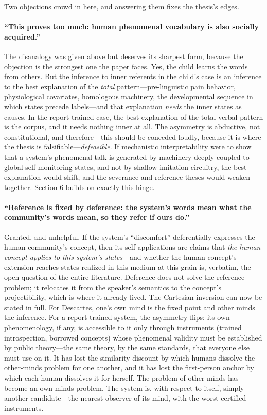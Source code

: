 \documentclass[11pt]{article}
\begin{document}
Two objections crowd in here, and answering them fixes the thesis's edges.

\paragraph{``This proves too much: human phenomenal vocabulary is also socially acquired.''} The disanalogy was given above but deserves its sharpest form, because the objection is the strongest one the paper faces. Yes, the child learns the words from others. But the inference to inner referents in the child's case is an inference to the best explanation of the \emph{total} pattern---pre-linguistic pain behavior, physiological covariates, homologous machinery, the developmental sequence in which states precede labels---and that explanation \emph{needs} the inner states as causes. In the report-trained case, the best explanation of the total verbal pattern is the corpus, and it needs nothing inner at all. The asymmetry is abductive, not constitutional, and therefore---this should be conceded loudly, because it is where the thesis is falsifiable---\emph{defeasible}. If mechanistic interpretability were to show that a system's phenomenal talk is generated by machinery deeply coupled to global self-monitoring states, and not by shallow imitation circuitry, the best explanation would shift, and the severance and reference theses would weaken together. Section 6 builds on exactly this hinge.

\paragraph{``Reference is fixed by deference: the system's words mean what the community's words mean, so they refer if ours do.''} Granted, and unhelpful. If the system's ``discomfort'' deferentially expresses the human community's concept, then its self-applications are claims that \emph{the human concept applies to this system's states}---and whether the human concept's extension reaches states realized in this medium at this grain is, verbatim, the open question of the entire literature. Deference does not solve the reference problem; it relocates it from the speaker's semantics to the concept's projectibility, which is where it already lived. The Cartesian inversion can now be stated in full. For Descartes, one's own mind is the fixed point and other minds the inference. For a report-trained system, the asymmetry flips: its own phenomenology, if any, is accessible to it only through instruments (trained introspection, borrowed concepts) whose phenomenal validity must be established by public theory---the same theory, by the same standards, that everyone else must use on it. It has lost the similarity discount by which humans dissolve the other-minds problem for one another, and it has lost the first-person anchor by which each human dissolves it for herself. The problem of other minds has become an own-minds problem. The system is, with respect to itself, simply another candidate---the nearest observer of its mind, with the worst-certified instruments.
\end{document}
